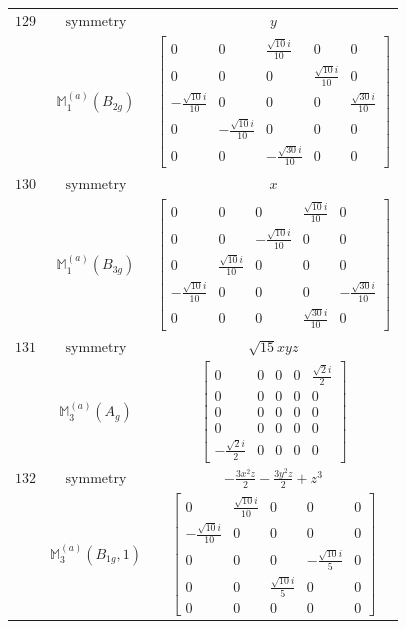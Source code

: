 \documentclass[fleqn,8pt,landscape]{jsarticle}
\begin{document}
\begin{longtable}{ccc}
$ 129 $ & $ \text{symmetry} $ & $ y $ \\
$  $ & $ \mathbb{M}_{1}^{(a)}(B_{2g}) $ & $ \begin{bmatrix} 0 & 0 & \frac{\sqrt{10} i}{10} & 0 & 0 \\ 0 & 0 & 0 & \frac{\sqrt{10} i}{10} & 0 \\ - \frac{\sqrt{10} i}{10} & 0 & 0 & 0 & \frac{\sqrt{30} i}{10} \\ 0 & - \frac{\sqrt{10} i}{10} & 0 & 0 & 0 \\ 0 & 0 & - \frac{\sqrt{30} i}{10} & 0 & 0 \end{bmatrix} $ \\ \hline
$ 130 $ & $ \text{symmetry} $ & $ x $ \\
$  $ & $ \mathbb{M}_{1}^{(a)}(B_{3g}) $ & $ \begin{bmatrix} 0 & 0 & 0 & \frac{\sqrt{10} i}{10} & 0 \\ 0 & 0 & - \frac{\sqrt{10} i}{10} & 0 & 0 \\ 0 & \frac{\sqrt{10} i}{10} & 0 & 0 & 0 \\ - \frac{\sqrt{10} i}{10} & 0 & 0 & 0 & - \frac{\sqrt{30} i}{10} \\ 0 & 0 & 0 & \frac{\sqrt{30} i}{10} & 0 \end{bmatrix} $ \\ \hline
$ 131 $ & $ \text{symmetry} $ & $ \sqrt{15} x y z $ \\
$  $ & $ \mathbb{M}_{3}^{(a)}(A_{g}) $ & $ \begin{bmatrix} 0 & 0 & 0 & 0 & \frac{\sqrt{2} i}{2} \\ 0 & 0 & 0 & 0 & 0 \\ 0 & 0 & 0 & 0 & 0 \\ 0 & 0 & 0 & 0 & 0 \\ - \frac{\sqrt{2} i}{2} & 0 & 0 & 0 & 0 \end{bmatrix} $ \\ \hline
$ 132 $ & $ \text{symmetry} $ & $ - \frac{3 x^{2} z}{2} - \frac{3 y^{2} z}{2} + z^{3} $ \\
$  $ & $ \mathbb{M}_{3}^{(a)}(B_{1g},1) $ & $ \begin{bmatrix} 0 & \frac{\sqrt{10} i}{10} & 0 & 0 & 0 \\ - \frac{\sqrt{10} i}{10} & 0 & 0 & 0 & 0 \\ 0 & 0 & 0 & - \frac{\sqrt{10} i}{5} & 0 \\ 0 & 0 & \frac{\sqrt{10} i}{5} & 0 & 0 \\ 0 & 0 & 0 & 0 & 0 \end{bmatrix} $ \\ \hline

\end{longtable}
\end{document}
